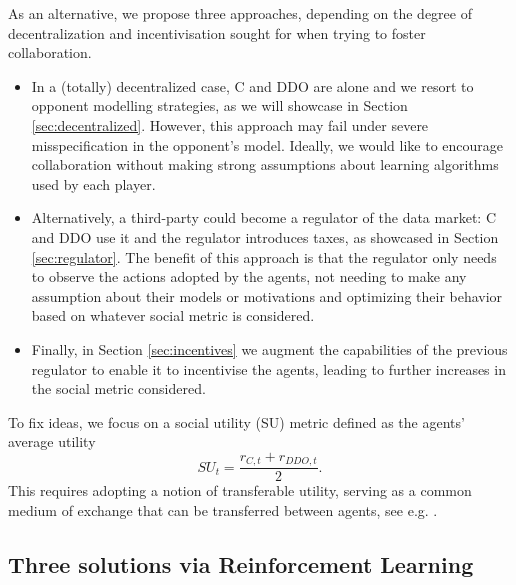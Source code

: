 As an alternative,  we propose three approaches, depending on the degree of decentralization and incentivisation sought for when trying 
to foster collaboration. 
\begin{itemize}
        \item In a (totally) decentralized case, C and DDO are alone and we resort to opponent modelling strategies,
        as we will showcase in Section \ref{sec:decentralized}. However, 
        this approach may fail under severe misspecification in the opponent's model. Ideally, we would
        like to encourage collaboration without making strong assumptions about learning algorithms used by each player. 
      
        \item Alternatively, a third-party could become a regulator of the data market: C and DDO use it and  
        the regulator introduces taxes, as showcased 
        in Section \ref{sec:regulator}. 
        The benefit of this approach is that the regulator only needs to observe the actions adopted by the agents, not needing to make any assumption about their models or motivations and optimizing their behavior based on whatever social metric is considered.
        
        \item Finally, in Section \ref{sec:incentives} we augment the capabilities of the previous regulator to enable it to  incentivise the agents, leading to further increases in the social metric considered.
    \end{itemize}

\noindent To fix ideas, we focus on a social utility (SU) metric
defined as the agents' average utility  
\begin{equation}\label{eq:su}
SU_t = \frac{r_{C,t} + r_{DDO,t}}{2}.
\end{equation}
This requires adopting a notion of transferable utility,
serving as a common medium of exchange that can be transferred between agents, see e.g. \textcite{aumann1960}.



\subsection{Three solutions via Reinforcement Learning}\label{sec:sols}


